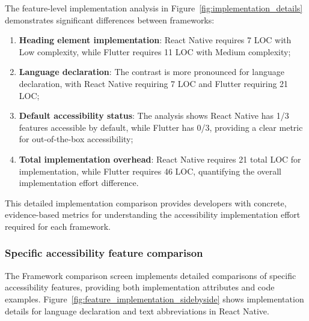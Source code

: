 \FloatBarrier

The feature-level implementation analysis in Figure~\ref{fig:implementation_details} demonstrates significant differences between frameworks:

\begin{enumerate}
    \item \textbf{Heading element implementation}: React Native requires 7 LOC with Low complexity, while Flutter requires 11 LOC with Medium complexity;
    
    \item \textbf{Language declaration}: The contrast is more pronounced for language declaration, with React Native requiring 7 LOC and Flutter requiring 21 LOC;
    
    \item \textbf{Default accessibility status}: The analysis shows React Native has 1/3 features accessible by default, while Flutter has 0/3, providing a clear metric for out-of-the-box accessibility;
    
    \item \textbf{Total implementation overhead}: React Native requires 21 total LOC for implementation, while Flutter requires 46 LOC, quantifying the overall implementation effort difference.
\end{enumerate}

This detailed implementation comparison provides developers with concrete, evidence-based metrics for understanding the accessibility implementation effort required for each framework.

\subsubsection{Specific accessibility feature comparison}

The Framework comparison screen implements detailed comparisons of specific accessibility features, providing both implementation attributes and code examples. Figure~\ref{fig:feature_implementation_sidebyside} shows implementation details for language declaration and text abbreviations in React Native.

